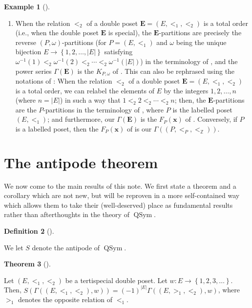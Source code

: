 \documentclass[numbers=enddot,12pt,final,onecolumn,notitlepage,abstracton]{scrartcl}
\theoremstyle{definition}
\newtheorem{theo}{Theorem}[section]
\newenvironment{theorem}[1][]
{\begin{theo}[#1]\begin{leftbar}}
{\end{leftbar}\end{theo}}
\newtheorem{defi}[theo]{Definition}
\newenvironment{definition}[1][]
{\begin{defi}[#1]\begin{leftbar}}
{\end{leftbar}\end{defi}}
\newtheorem{exam}[theo]{Example}
\newenvironment{example}[1][]
{\begin{exam}[#1]\begin{leftbar}}
{\end{leftbar}\end{exam}}
\newcommand{\xx}{{\mathbf{x}}}
\newcommand{\QSym}{{\operatorname{QSym}}}
\newcommand{\EE}{{\mathbf{E}}}
\newcommand{\ZZ}{{\mathbb{Z}}}
\begin{document}
\begin{example}
\begin{enumerate}
\item[(f)] When the relation $<_2$ of a double poset
$\EE = \left(E, <_1, <_2\right)$ is a total order (i.e.,
when the double poset $\EE$ is special), the
$\EE$-partitions are precisely the
reverse $\left(P, \omega\right)$-partitions (for
$P = \left(E, <_1\right)$ and $\omega$ being the unique
bijection $E \to \left\{1,2,\ldots,\left|E\right|\right\}$
satisfying
$\omega^{-1}\left(1\right) <_2 \omega^{-1}\left(2\right) <_2 \cdots
<_2 \omega^{-1}\left(\left|E\right|\right)$)
in the terminology
of \cite[\S 7.19]{Stanley-EC2}, and the power series
$\Gamma\left(\EE\right)$ is the $K_{P, \omega}$ of
\cite[\S 7.19]{Stanley-EC2}.
This can also be rephrased using
the notations of \cite[\S 5.2]{Reiner}: When the relation $<_2$ of a
double poset $\EE = \left(E, <_1, <_2\right)$ is a total order, we can
relabel the elements of $E$ by the integers $1, 2, \ldots, n$
(where $n = \left|E\right|$) in such
a way that $1 <_2 2 <_2 \cdots <_2 n$; then, the $\EE$-partitions are
the $P$-partitions in the terminology of \cite[Definition 5.2.1]{Reiner},
where $P$ is the labelled poset $\left(E, <_1\right)$; and furthermore,
our $\Gamma\left(\EE\right)$ is the $F_P\left(\xx\right)$ of
\cite[Definition 5.2.1]{Reiner}. Conversely, if $P$ is a labelled poset, then
the $F_P\left(\xx\right)$ of \cite[Definition 5.2.1]{Reiner} is our
$\Gamma\left(\left(P, <_P, <_{\ZZ}\right)\right)$.

\end{enumerate}

\end{example}

\section{The antipode theorem}
\label{sect.antipode}

We now come to the main results of this note. We first state a
theorem and a corollary which are not new, but will be reproven in
a more self-contained way which allows them to take their
(well-deserved) place as fundamental results rather than
afterthoughts in the theory of $\QSym$.

\begin{definition}
We let $S$ denote the antipode of $\QSym$.
\end{definition}

\begin{theorem}
\label{thm.antipode.Gammaw}
Let $\left(E, <_1, <_2\right)$ be a tertispecial double poset.
Let $w : E \to \left\{1, 2, 3, \ldots\right\}$. Then,
$S\left(\Gamma\left(\left(E, <_1, <_2\right), w\right)\right)
= \left(-1\right)^{\left|E\right|}
\Gamma\left(\left(E, >_1, <_2\right), w\right)$,
where $>_1$ denotes the opposite relation of $<_1$.
\end{theorem}
\end{document}
